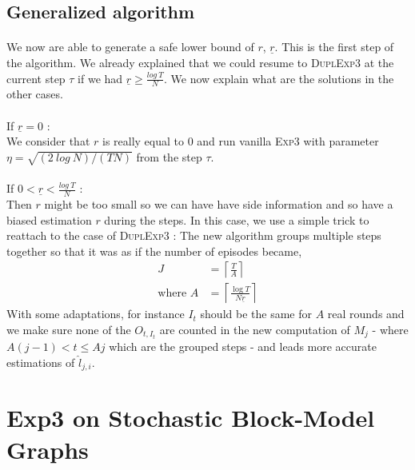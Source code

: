 \documentclass[11pt,a4paper]{article}
\begin{document}
\subsection{Generalized algorithm}
\paragraph{}We now are able to generate a safe lower bound of $r$, $\underline{r}$. This is the first step of the algorithm. We already explained that we could resume to \textsc{DuplExp3} at the current step $\tau$ if we had $ \underline{r} \geq \frac{log\ T}{N}$. We now explain what are the solutions in the other cases.\\

\paragraph{} If $\underline{r}=0$ : \\
We consider that $r$ is really equal to $0$ and run vanilla \textsc{Exp3} with parameter $\eta=\sqrt{\left(2\ log\ N \right)/\left(TN\right)}$ from the step $\tau$.

\paragraph{}If $0 < \underline{r} < \frac{log\ T}{N}$ :\\
Then $r$ might be too small so we can have have side information and so have a biased estimation $r$ during the steps. In this case, we use a simple trick to reattach to the case of \textsc{DuplExp3} : The new algorithm groups multiple steps together so that it was as if the number of episodes became,
\begin{align*}
J &= \left\lceil \frac{T}{A} \right\rceil \\
\text{where }A & =\left\lceil \frac{\log T}{N \underline{r}} \right\rceil
\end{align*}
With some adaptations, for instance $I_t$ should be the same for $A$ real rounds and we make sure none of the $O_{t,I_t}$ are counted in the new computation of $M_j$ - where $A(j-1)<t\leq Aj$ which are the grouped steps - and leads more accurate estimations of $\hat{l}_{j,i}$.

\section{Exp3 on Stochastic Block-Model Graphs}
\end{document}
